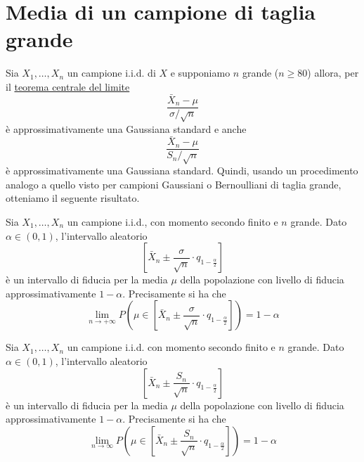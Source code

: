 \section{Media di un campione di taglia grande}
Sia $X_1, \dots, X_n$ un campione i.i.d. di $X$ e supponiamo $n$ grande ($n \geq 80$) allora, per
il \hyperref[th: tcl]{teorema centrale del limite}
\[ \frac{\bar{X}_n - \mu}{\sigma / \sqrt{n}} \]
è approssimativamente una Gaussiana standard e anche
\[ \frac{\bar{X}_n - \mu}{S_n / \sqrt{n}} \]
è approssimativamente una Gaussiana standard. Quindi, usando un procedimento analogo a quello visto
per campioni Gaussiani o Bernoulliani di taglia grande, otteniamo il seguente risultato.

\begin{proposition}
	Sia $X_1, \dots, X_n$ un campione i.i.d., con momento secondo finito e $n$ grande. Dato
	$\alpha \in (0,1)$, l'intervallo aleatorio
	\[ \left[ \bar{X}_n \pm \frac{\sigma}{\sqrt{n}} \cdot q_{1 - \frac{\alpha}{2}} \right] \]
	è un intervallo di fiducia per la media $\mu$ della popolazione con livello di fiducia
	approssimativamente $1 - \alpha$. Precisamente si ha che
	\[
		\lim_{n \to +\infty} P \left( \mu \in \left[
			\bar{X}_n \pm \frac{\sigma}{\sqrt{n}} \cdot q_{1 - \frac{\alpha}{2}}
			\right] \right) = 1 - \alpha
	\]
\end{proposition}

\begin{proposition}
	Sia $X_1, \dots, X_n$ un campione i.i.d. con momento secondo finito e $n$ grande. Dato
	$\alpha \in (0,1)$, l'intervallo aleatorio
	\[ \left[ \bar{X}_n \pm \frac{S_n}{\sqrt{n}} \cdot q_{1 - \frac{\alpha}{2}} \right] \]
	è un intervallo di fiducia per la media $\mu$ della popolazione con livello di fiducia
	approssimativamente $1-\alpha$. Precisamente si ha che
	\[
		\lim_{n \to \infty} P \left( \mu \in \left[
			\bar{X}_n \pm \frac{S_n}{\sqrt{n}} \cdot q_{1 - \frac{\alpha}{2}}
			\right] \right) = 1 - \alpha
	\]
\end{proposition}
